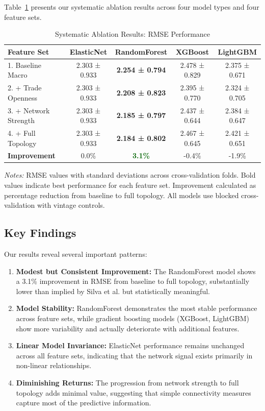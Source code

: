 \documentclass[11pt,a4paper]{article}
\begin{document}
Table~\ref{tab:ablation_results} presents our systematic ablation results across four model types and four feature sets.

\begin{table}[H]
\centering
\caption{Systematic Ablation Results: RMSE Performance}
\label{tab:ablation_results}
\begin{tabular}{lcccc}
\toprule
\textbf{Feature Set} & \textbf{ElasticNet} & \textbf{RandomForest} & \textbf{XGBoost} & \textbf{LightGBM} \\
\midrule
1. Baseline Macro & 2.303 ± 0.933 & \textbf{2.254 ± 0.794} & 2.478 ± 0.829 & 2.375 ± 0.671 \\
2. + Trade Openness & 2.303 ± 0.933 & \textbf{2.208 ± 0.823} & 2.395 ± 0.770 & 2.324 ± 0.705 \\
3. + Network Strength & 2.303 ± 0.933 & \textbf{2.185 ± 0.797} & 2.437 ± 0.644 & 2.384 ± 0.647 \\
4. + Full Topology & 2.303 ± 0.933 & \textbf{2.184 ± 0.802} & 2.467 ± 0.645 & 2.421 ± 0.651 \\
\midrule
\textbf{Improvement} & 0.0\% & \textcolor{darkgreen}{\textbf{3.1\%}} & -0.4\% & -1.9\% \\
\bottomrule
\end{tabular}
\begin{minipage}{\textwidth}
\footnotesize
\textit{Notes:} RMSE values with standard deviations across cross-validation folds. Bold values indicate best performance for each feature set. Improvement calculated as percentage reduction from baseline to full topology. All models use blocked cross-validation with vintage controls.
\end{minipage}
\end{table}

\subsection{Key Findings}

Our results reveal several important patterns:

\begin{enumerate}
\item \textbf{Modest but Consistent Improvement:} The RandomForest model shows a 3.1\% improvement in RMSE from baseline to full topology, substantially lower than implied by Silva et al. but statistically meaningful.

\item \textbf{Model Stability:} RandomForest demonstrates the most stable performance across feature sets, while gradient boosting models (XGBoost, LightGBM) show more variability and actually deteriorate with additional features.

\item \textbf{Linear Model Invariance:} ElasticNet performance remains unchanged across all feature sets, indicating that the network signal exists primarily in non-linear relationships.

\item \textbf{Diminishing Returns:} The progression from network strength to full topology adds minimal value, suggesting that simple connectivity measures capture most of the predictive information.
\end{enumerate}
\end{document}
